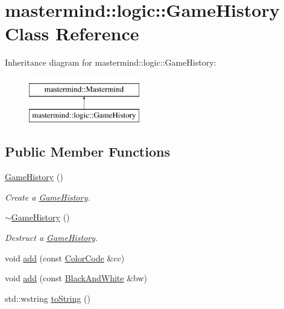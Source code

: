 \hypertarget{classmastermind_1_1logic_1_1_game_history}{}\section{mastermind\+:\+:logic\+:\+:Game\+History Class Reference}
\label{classmastermind_1_1logic_1_1_game_history}
Inheritance diagram for mastermind\+:\+:logic\+:\+:Game\+History\+:\begin{figure}[H]
\begin{center}
\leavevmode
\includegraphics[height=2.000000cm]{classmastermind_1_1logic_1_1_game_history}
\end{center}
\end{figure}
\subsection*{Public Member Functions}
\begin{DoxyCompactItemize}
\item 
\hypertarget{classmastermind_1_1logic_1_1_game_history_a4731c4c94790c94c5f5e72a5ef344602}{}\label{classmastermind_1_1logic_1_1_game_history_a4731c4c94790c94c5f5e72a5ef344602} 
\hyperlink{classmastermind_1_1logic_1_1_game_history_a4731c4c94790c94c5f5e72a5ef344602}{Game\+History} ()
\begin{DoxyCompactList}\small\item\em Create a \hyperlink{classmastermind_1_1logic_1_1_game_history}{Game\+History}. \end{DoxyCompactList}\item 
\hypertarget{classmastermind_1_1logic_1_1_game_history_a7f94763f41492e795201f000874ba9e1}{}\label{classmastermind_1_1logic_1_1_game_history_a7f94763f41492e795201f000874ba9e1} 
\hyperlink{classmastermind_1_1logic_1_1_game_history_a7f94763f41492e795201f000874ba9e1}{$\sim$\+Game\+History} ()
\begin{DoxyCompactList}\small\item\em Destruct a \hyperlink{classmastermind_1_1logic_1_1_game_history}{Game\+History}. \end{DoxyCompactList}\item 
void \hyperlink{classmastermind_1_1logic_1_1_game_history_a7f741fcc70b681d0277936b5aa23cc5c}{add} (const \hyperlink{classmastermind_1_1logic_1_1_color_code}{Color\+Code} \&cc)
\item 
void \hyperlink{classmastermind_1_1logic_1_1_game_history_a14484fd24f50446003096140aaff086b}{add} (const \hyperlink{classmastermind_1_1logic_1_1_black_and_white}{Black\+And\+White} \&bw)
\item 
std\+::wstring \hyperlink{classmastermind_1_1logic_1_1_game_history_a4b2d573dd63908a204a8bbd73d426d46}{to\+String} ()
\end{DoxyCompactItemize}
